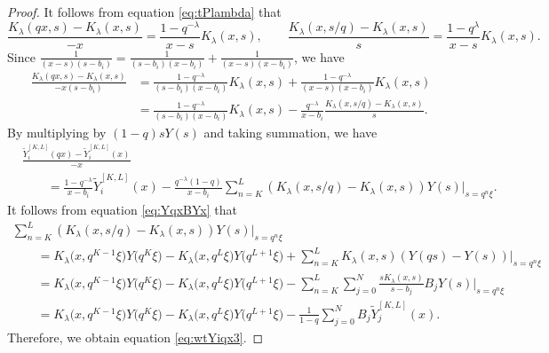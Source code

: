 \documentclass[pdftex]{sigma}
\numberwithin{equation}{section}
\theoremstyle{definition}
\begin{document}
\begin{proof}
It follows from equation \eqref{eq:tPlambda} that
\begin{equation*}
 \frac{K_{\lambda}(qx, s) - K_{\lambda}(x, s)}{-x} = \frac{1- q^{-\lambda } }{x-s} K_{\lambda}(x, s) , \qquad \frac{K_{\lambda}(x, s/q) - K_{\lambda}(x, s)}{s} = \frac{1-q^{\lambda }}{x-s} K_{\lambda}(x, s).
\end{equation*}
Since
$
 \frac{1}{(x-s)(s-b_i)} = \frac{1}{(s-b_i)(x-b_i)} + \frac{1}{(x-s)(x-b_i)}$,
we have
\begin{align*}
 \frac{K_{\lambda}(qx, s) - K_{\lambda}(x, s)}{-x(s-b_i)}
&= \frac{ 1- q^{-\lambda } }{(s-b_i)(x-b_i)} K_{\lambda}(x, s) + \frac{ 1- q^{-\lambda } }{(x-s)(x-b_i)} K_{\lambda}(x, s) \\
& = \frac{ 1- q^{-\lambda } }{(s-b_i)(x-b_i)} K_{\lambda}(x, s) - \frac{q^{-\lambda } }{x-b_i} \frac{K_{\lambda}(x, s/q) - K_{\lambda}(x, s)}{s}.
\end{align*}
By multiplying by $(1-q) s Y(s)$ and taking summation, we have
\begin{align}
& \frac{\widetilde{Y}_{i}^{[K,L]}(qx) - \widetilde{Y}_{i}^{[K,L]}(x)}{-x} \nonumber \\
&\qquad =  \frac{ 1- q^{-\lambda } }{x - b_{i}} \widetilde{Y}_{i}^{[K,L]}(x)
- \frac{ q^{-\lambda } (1-q) }{x - b_{i}}\sum _{n=K}^{L} (K_{\lambda}(x, s/q) - K_{\lambda}(x, s)) Y(s)|_{s= q^n \xi }.  \label{eq:YiKLqxx}
\end{align}
It follows from equation \eqref{eq:YqxBYx} that
\begin{gather*}
 \sum _{n=K}^{L} (K_{\lambda}(x, s/q) - K_{\lambda}(x, s)) Y(s)|_{s= q^n \xi } \\
\qquad= K_{\lambda}\bigl(x, q^{K-1} \xi\bigr)Y\bigl(q^{K} \xi\bigr) - K_{\lambda}\bigl(x, q^{L} \xi\bigr)Y\bigl(q^{L+1} \xi\bigr) + \sum _{n=K}^{L} K_{\lambda}(x, s)( Y(q s) -Y(s))|_{s= q^n \xi } \\
\qquad = K_{\lambda}\bigl(x, q^{K-1} \xi\bigr)Y\bigl(q^{K} \xi\bigr) -K_{\lambda}\bigl(x, q^{L} \xi\bigr)Y\bigl(q^{L+1} \xi\bigr) - \sum _{n=K}^{L} \sum^{N}_{j = 0}\frac{ s K_{\lambda}(x, s)}{s - b_{j}}B_{j} Y(s) |_{s= q^n \xi } \\
\qquad = K_{\lambda}\bigl(x, q^{K-1} \xi\bigr)Y\bigl(q^{K} \xi\bigr) - K_{\lambda}\bigl(x, q^{L} \xi\bigr)Y\bigl(q^{L+1} \xi\bigr) - \frac{1 }{1-q}\sum^{N}_{j = 0} B_{j} \widetilde{Y}_{j}^{[K,L]}(x).
\end{gather*}
Therefore, we obtain equation \eqref{eq:wtYiqx3}.
\end{proof}
\end{document}
